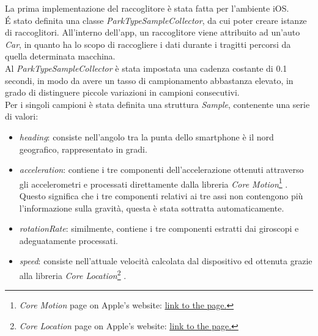La prima implementazione del raccoglitore è stata fatta per l'ambiente iOS.\\
\'E stato definita una classe \emph{ParkTypeSampleCollector}, da cui poter creare
istanze di raccoglitori. All'interno dell'app, un raccoglitore viene attribuito ad
un'auto \emph{Car}, in quanto ha lo scopo di raccogliere i dati durante i tragitti 
percorsi da quella determinata macchina.\\
Al \emph{ParkTypeSampleCollector} è stata impostata una cadenza costante di 0.1
secondi, in modo da avere un tasso di campionamento abbastanza elevato, in grado
di distinguere piccole variazioni in campioni consecutivi.\\
Per i singoli campioni è stata definita una struttura \emph{Sample}, contenente
una serie di valori:
\begin{itemize}
    \item \emph{heading}: consiste nell'angolo tra la punta dello smartphone è il nord geografico,
    rappresentato in gradi.
    \item \emph{acceleration}: contiene i tre componenti dell'accelerazione ottenuti attraverso 
    gli accelerometri e processati direttamente dalla libreria \emph{Core Motion}\footnote{\emph{Core Motion} page on Apple's website: 
    \href{https://developer.apple.com/documentation/coremotion}{\underline{link to the page.}}}
    \cite{using_core_motion}. 
    Questo significa che i tre componenti relativi ai tre assi non contengono più
    l'informazione sulla gravità, questa è stata sottratta automaticamente.
    \item \emph{rotationRate}: similmente, contiene i tre componenti estratti dai giroscopi
    e adeguatamente processati.
    \item \emph{speed}: consiste nell'attuale velocità calcolata dal dispositivo ed ottenuta 
    grazie alla libreria \emph{Core Location}\footnote{\emph{Core Location} page on Apple's website: 
    \href{https://developer.apple.com/documentation/corelocation}{\underline{link to the page.}}}
    \cite{introduction_core_location}.
\end{itemize}


